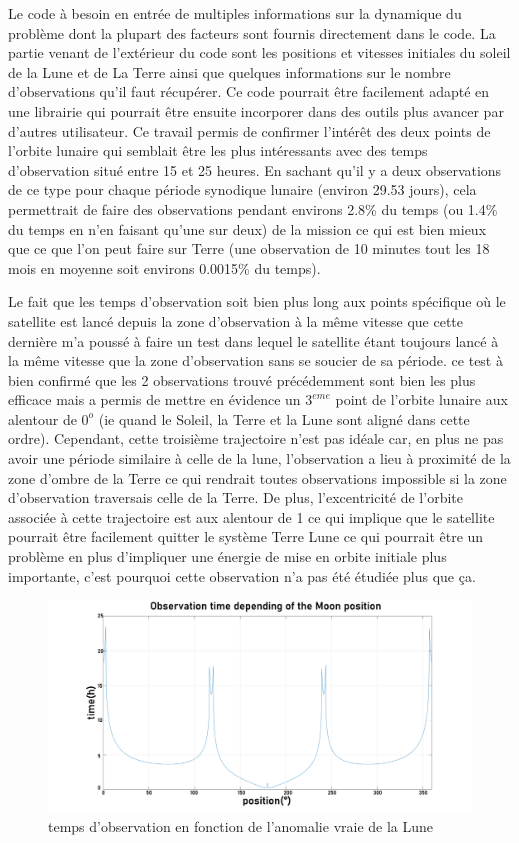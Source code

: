 \documentclass[12pt]{article} %
\begin{document}
		Le code à besoin en entrée de multiples informations sur la dynamique du problème dont la plupart des facteurs sont fournis directement dans le code. La partie venant de l'extérieur du code sont les positions et vitesses initiales du soleil de la Lune et de La Terre ainsi que quelques informations sur le nombre d'observations qu'il faut récupérer.
		Ce code pourrait être facilement adapté en une librairie qui pourrait être ensuite incorporer dans des outils plus avancer par d'autres utilisateur.
		Ce travail permis de confirmer l'intérêt des deux points de l'orbite lunaire qui semblait être les plus intéressants avec des temps d'observation situé entre 15 et 25 heures. En sachant qu'il y a deux observations de ce type pour chaque période synodique lunaire (environ 29.53 jours), cela permettrait de faire des observations pendant environs 2.8\% du temps (ou 1.4\% du temps en n'en faisant qu'une sur deux) de la mission ce qui est bien mieux que ce que l'on peut faire sur Terre (une observation de 10 minutes tout les 18 mois en moyenne soit environs 0.0015\% du temps).
		
		Le fait que les temps d'observation soit bien plus long aux points spécifique où le satellite est lancé depuis la zone d'observation à la même vitesse que cette dernière m'a poussé à faire un test dans lequel le satellite étant toujours lancé à la même vitesse que la zone d'observation sans se soucier de sa période. ce test à bien confirmé que les 2 observations trouvé précédemment sont bien les plus efficace mais a permis de mettre en évidence un $3^{eme}$ point de l'orbite lunaire aux alentour de $0^o$ (ie quand le Soleil, la Terre et la Lune sont aligné dans cette ordre). Cependant, cette troisième trajectoire n'est pas idéale car, en plus ne pas avoir une période similaire à celle de la lune, l'observation a lieu à proximité de la zone d'ombre de la Terre ce qui rendrait toutes observations impossible si la zone d'observation traversais celle de la Terre. De plus, l'excentricité de l'orbite associée à cette trajectoire est aux alentour de 1 ce qui implique que le satellite pourrait être facilement quitter le système Terre Lune ce qui pourrait être un problème en plus d'impliquer une énergie de mise en orbite initiale plus importante, c'est pourquoi cette observation n'a pas été étudiée plus que ça.
		\begin{figure}[h]
			\includegraphics[width=1\textwidth]{images/observation_Obs.png}
			\caption{temps d'observation en fonction de l'anomalie vraie de la Lune}
		\end{figure}
		
\end{document}

